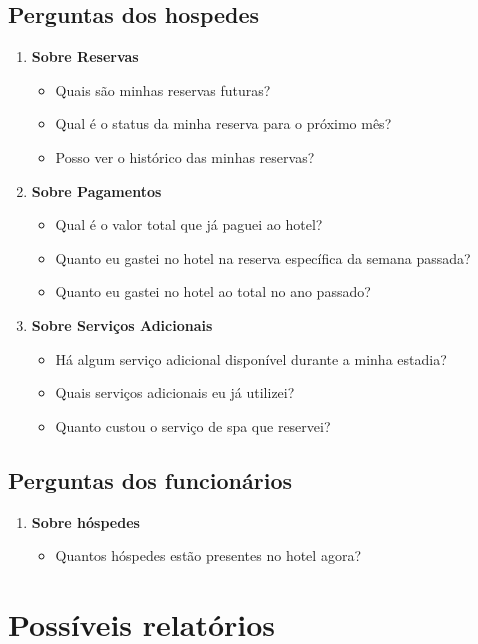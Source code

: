 \subsection{Perguntas dos hospedes}
\begin{enumerate}
    \item \textbf{Sobre Reservas}
    \begin{itemize}
        \item Quais são minhas reservas futuras?
        \item Qual é o status da minha reserva para o próximo mês?
        \item Posso ver o histórico das minhas reservas?
    \end{itemize}
    \item \textbf{Sobre Pagamentos}
    \begin{itemize}
        \item Qual é o valor total que já paguei ao hotel?
        \item Quanto eu gastei no hotel na reserva específica da semana passada?
        \item Quanto eu gastei no hotel ao total no ano passado?
    \end{itemize}
    \item \textbf{Sobre Serviços Adicionais}
    \begin{itemize}
        \item Há algum serviço adicional disponível durante a minha estadia?
        \item Quais serviços adicionais eu já utilizei?
        \item Quanto custou o serviço de spa que reservei?
    \end{itemize}
\end{enumerate}

\subsection{Perguntas dos funcionários}
\begin{enumerate}
    \item \textbf{Sobre hóspedes}
    \begin{itemize}
        \item Quantos hóspedes estão presentes no hotel agora?
    \end{itemize}
\end{enumerate}

\newpage

\section{Possíveis relatórios}

